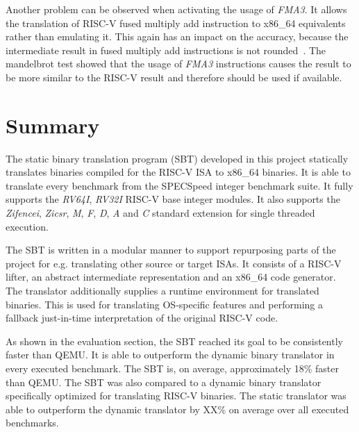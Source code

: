 \documentclass[course=eragp]{aspdoc}
\begin{document}
\par

Another problem can be observed when activating the usage of \textit{FMA3}. It allows the
translation of RISC-V fused multiply add instruction to x86\_64 equivalents rather than emulating
it. This again has an impact on the accuracy, because the intermediate result in fused multiply add
instructions is not rounded~\cite{intel2017man}. The mandelbrot test showed that the usage of
\textit{FMA3} instructions causes the result to be more similar to the RISC-V result and therefore
should be used if available.

\section{Summary}

The static binary translation program (SBT) developed in this project statically translates binaries
compiled for the RISC-V ISA to x86\_64 binaries. It is able to translate every benchmark
from the SPECSpeed integer benchmark suite. It fully supports the \textit{RV64I},
\textit{RV32I} RISC-V base integer modules. It also supports the \textit{Zifencei}, \textit{Zicsr},
\textit{M}, \textit{F}, \textit{D}, \textit{A} and \textit{C} standard extension for single threaded
execution.

\par

The SBT is written in a modular manner to support repurposing parts of the project for e.g.
translating other source or target ISAs. It consists of a RISC-V lifter, an abstract intermediate
representation and an x86\_64 code generator. The translator additionally supplies a runtime
environment for translated binaries. This is used for translating OS-specific features and
performing a fallback just-in-time interpretation of the original RISC-V code.

\par

As shown in the evaluation section, the SBT reached its goal to be consistently faster than QEMU. It is able to outperform
the dynamic binary translator in every executed benchmark. The SBT is, on average, approximately
18\% faster than QEMU. The SBT was also compared to a dynamic binary translator specifically
optimized for translating RISC-V binaries. The static translator
was able to outperform the dynamic translator by XX\% on average over all executed benchmarks.

\par
\end{document}
